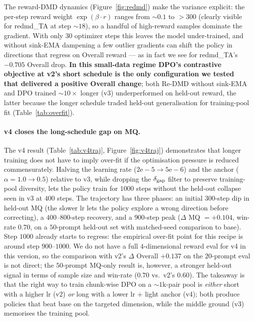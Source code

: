 \documentclass{article}
\begin{document}
The reward-DMD dynamics (Figure~\ref{fig:redmd}) make the variance explicit: the per-step reward weight $\exp(\beta \cdot r)$ ranges from ${\sim}0.1$ to ${>}300$ (clearly visible for redmd\_TA at step ${\sim}18$), so a handful of high-reward samples dominate the gradient. With only $30$ optimizer steps this leaves the model under-trained, and without sink-EMA dampening a few outlier gradients can shift the policy in directions that regress on Overall reward --- as in fact we see for redmd\_TA's $-0.705$ Overall drop. \textbf{In this small-data regime DPO's contrastive objective at v2's short schedule is the only configuration we tested that delivered a positive Overall change}; both Re-DMD without sink-EMA and DPO trained $\sim10\times$ longer (v3) underperformed on held-out reward, the latter because the longer schedule traded held-out generalisation for training-pool fit (Table~\ref{tab:overfit}).

\paragraph{v4 closes the long-schedule gap on MQ.} The v4 result (Table~\ref{tab:v4traj}, Figure~\ref{fig:v4traj}) demonstrates that longer training does not have to imply over-fit if the optimisation pressure is reduced commensurately. Halving the learning rate ($2\mathrm{e}{-}5 \to 5\mathrm{e}{-}6$) and the anchor ($\alpha=1.0 \to 0.5$) relative to v3, while dropping the $\delta_{\rm gap}$ filter to preserve training-pool diversity, lets the policy train for $1000$ steps without the held-out collapse seen in v3 at $400$ steps. The trajectory has three phases: an initial $300$-step dip in held-out MQ (the slower lr lets the policy explore a wrong direction before correcting), a $400$--$800$-step recovery, and a $900$-step peak ($\Delta$ MQ $=+0.104$, win-rate $0.70$, on a $50$-prompt held-out set with matched-seed comparison to base). Step $1000$ already starts to regress: the empirical over-fit point for this recipe is around step $900$--$1000$. We do not have a full $4$-dimensional reward eval for v4 in this version, so the comparison with v2's $\Delta$ Overall $+0.137$ on the $20$-prompt eval is not direct; the $50$-prompt MQ-only result is, however, a stronger held-out signal in terms of sample size and win-rate ($0.70$ vs.\ v2's $0.60$). The takeaway is that the right way to train chunk-wise DPO on a $\sim 1$k-pair pool is \emph{either} short with a higher lr (v2) \emph{or} long with a lower lr + light anchor (v4); both produce policies that beat base on the targeted dimension, while the middle ground (v3) memorises the training pool.
\end{document}
